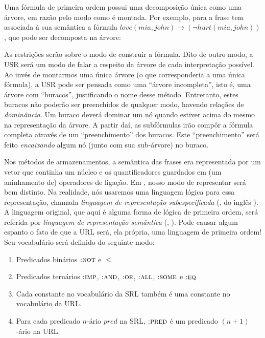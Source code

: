 Uma fórmula de primeira ordem possui uma decomposição única como uma árvore, em razão pelo modo como é montada. Por exemplo, para a frase  tem associada à sua semântica a fórmula $love(mia,john) \rightarrow (\neg hurt(mia,john))$, que pode ser decomposta na árvore:

\begin{center}
\end{center}

As restrições serão sobre o modo de construir a fórmula. Dito de outro modo, a USR será um modo de falar a respeito da árvore de cada interpretação possível. Ao invés de montarmos uma única árvore (o que corresponderia a uma única fórmula), a USR pode ser pensada como uma ``árvore incompleta'', isto é, uma árvore com ``buracos'', justificando o nome desse método. Entretanto, estes buracos não poderão ser preenchidos de qualquer modo, havendo relações de \textit{dominância}. Um buraco deverá dominar um nó quando estiver acima do mesmo na representação da árvore. A partir daí, as subfórmulas irão compôr a fórmula completa através de um ``preenchimento'' dos buracos. Este ``preenchimento'' será feito \textit{encaixando} algum nó (junto com sua sub-árvore) no buraco.

Nos métodos de armazenamentos, a semântica das frases era representada por um vetor que continha um núcleo e os quantificadores guardados em (um aninhamento de) operadores de ligação. Em , nosso modo de representar será bem distinto. Na realidade, nós usaremos uma linguagem lógica para essa representação, chamada \textit{linguagem de representação subespecificada} (, do inglês ). A linguagem original, que aqui é alguma forma de lógica de primeira ordem, será referida por \textit{linguagem de representação semântica} (, ). Pode causar algum espanto o fato de que a URL será, ela própria, uma linguagem de primeira ordem! Seu vocabulário será definido do seguinte modo:

\begin{enumerate}
\item Predicados binários $\textsc{:not}$ e $\leq$
\item Predicados ternários $\textsc{:imp}$, $\textsc{:and}$, $\textsc{:or}$, $\textsc{:all}$, $\textsc{:some}$ e $\textsc{:eq}$
\item Cada constante no vocabulário da SRL também é uma constante no vocabulário da URL.
\item Para cada predicado $n$-ário $pred$ na SRL, $\textsc{:pred}$ é um predicado $(n+1)$-ário na URL.
\end{enumerate}

